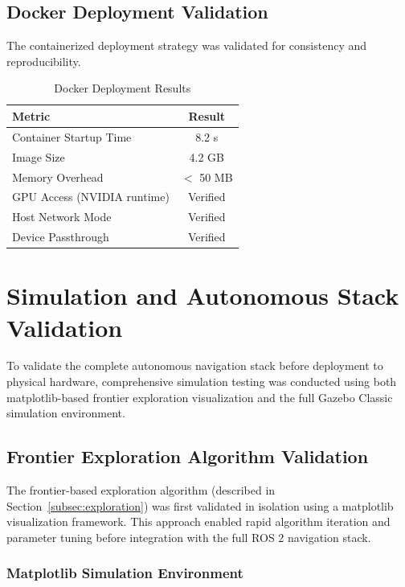 \subsection{Docker Deployment Validation}

The containerized deployment strategy was validated for consistency and reproducibility.

\begin{table}[H]
\centering
\caption{Docker Deployment Results}
\label{tab:docker_results}
\begin{tabular}{|l|c|}
\hline
\textbf{Metric} & \textbf{Result} \\
\hline
Container Startup Time & 8.2 s \\
Image Size & 4.2 GB \\
Memory Overhead & $<$ 50 MB \\
GPU Access (NVIDIA runtime) & Verified \\
Host Network Mode & Verified \\
Device Passthrough & Verified \\
\hline
\end{tabular}
\end{table}

\section{Simulation and Autonomous Stack Validation}
\label{sec:simulation_results}

To validate the complete autonomous navigation stack before deployment to physical hardware, comprehensive simulation testing was conducted using both matplotlib-based frontier exploration visualization and the full Gazebo Classic simulation environment.

\subsection{Frontier Exploration Algorithm Validation}
\label{subsec:frontier_validation}

The frontier-based exploration algorithm (described in Section~\ref{subsec:exploration}) was first validated in isolation using a matplotlib visualization framework. This approach enabled rapid algorithm iteration and parameter tuning before integration with the full ROS 2 navigation stack.

\subsubsection{Matplotlib Simulation Environment}

